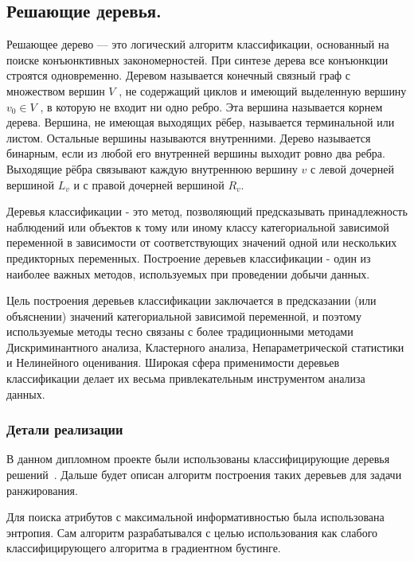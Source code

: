 \subsection{Решающие деревья.}

Решающее дерево — это логический алгоритм классификации, основанный на поиске конъюнктивных закономерностей. При синтезе дерева все конъюнкции строятся одновременно. Деревом называется конечный связный граф с множеством вершин $V$ , не содержащий циклов и имеющий выделенную вершину $v_0 \in V$ , в которую не входит ни одно ребро. Эта вершина называется корнем дерева. Вершина, не имеющая выходящих рёбер, называется терминальной или листом. Остальные вершины называются внутренними. Дерево называется бинарным, если из любой его внутренней вершины выходит ровно два ребра. Выходящие рёбра связывают каждую внутреннюю вершину $v$ с левой дочерней вершиной $L_v$ и $с$ правой дочерней вершиной $R_v$.

Деревья классификации - это метод, позволяющий предсказывать принадлежность наблюдений или объектов к тому или иному классу категориальной зависимой переменной в зависимости от соответствующих значений одной или нескольких предикторных переменных. Построение деревьев классификации - один из наиболее важных методов, используемых при проведении добычи данных.

Цель построения деревьев классификации заключается в предсказании (или объяснении) значений категориальной зависимой переменной, и поэтому используемые методы тесно связаны с более традиционными методами Дискриминантного анализа, Кластерного анализа, Непараметрической статистики и Нелинейного оценивания. Широкая сфера применимости деревьев классификации делает их весьма привлекательным инструментом анализа данных.

\subsubsection{Детали реализации}

В данном дипломном проекте были использованы классифицирующие деревья решений~\cite{cart_book}. Дальше будет описан алгоритм построения таких деревьев для задачи ранжирования.

Для поиска атрибутов с максимальной информативностью была использована энтропия. Сам алгоритм разрабатывался с целью использования как слабого классифицирующего алгоритма в градиентном бустинге.

